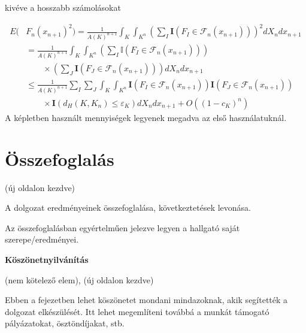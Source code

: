 \documentclass[a4paper,12pt]{report}
\theoremstyle{definition}
\theoremstyle{remark}
\begin{document}
kivéve a hosszabb számolásokat

\begin{align}
E (& F_n(x_{n+1})^2) = \frac 1{A(K)^{n+1}}\int_K\int_{K^n} \left (\sum_I \mathbf I (F_I\in\mathcal F_{n}(x_{n+1}))\right )^2 d X_n d x_{n+1}\nonumber\\
& = \frac 1{A(K)^{n+1}} \int_K\int_{K^n} \left (\sum_I \mathbb I (F_I\in\mathcal F_{n}(x_{n+1}))\right ) \nonumber \\
& \quad \quad \times \left (\sum_J \mathbf I (F_J\in\mathcal F_{n}(x_{n+1}))\right ) d X_n d x_{n+1}\nonumber\\
&\leq \frac 1{A(K)^{n+1}}\sum_I\sum_J \int_K\int_{K^n} \mathbf I (F_I\in\mathcal F_{n}(x_{n+1}))
\mathbf I (F_J\in\mathcal F_{n}(x_{n+1}))\nonumber\\
&\quad\quad\times\mathbf I(d_H(K,K_n)\leq\varepsilon_K) d X_n d x_{n+1}
+O((1-c_K)^n)\label{ineq1}
\end{align}
A képletben használt mennyiségek legyenek megadva az első használatuknál.
\chapter{Összefoglalás}

(új oldalon kezdve)

A dolgozat eredményeinek összefoglalása, következtetések levonása.

Az összefoglalásban egyértelműen jelezve legyen a hallgató saját szerepe/eredményei.

\newpage


 

\newpage
{\Huge \bf Köszönetnyilvánítás}


\vspace{2 cm}

(nem kötelező elem), (új oldalon kezdve) 

Ebben a fejezetben lehet köszönetet mondani mindazoknak, akik segítették a dolgozat elkészülését. Itt lehet megemlíteni továbbá a munkát támogató pályázatokat, ösztöndíjakat, stb.
\end{document}
